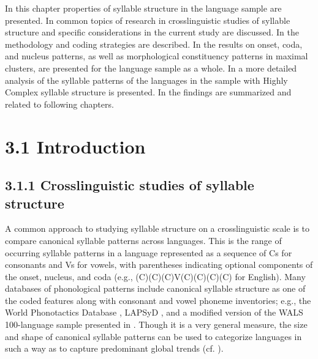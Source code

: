   In this chapter properties of syllable structure in the language sample are presented. In  common topics of research in crosslinguistic studies of syllable structure and specific considerations in the current study are discussed. In  the methodology and coding strategies are described. In  the results on onset, coda, and nucleus patterns, as well as morphological constituency patterns in maximal clusters, are presented for the language sample as a whole. In  a more detailed analysis of the syllable patterns of the languages in the sample with Highly Complex syllable structure is presented. In  the findings are summarized and related to following chapters.


\section{3.1 Introduction}
\subsection{3.1.1 Crosslinguistic studies of syllable structure}

  A common approach to studying syllable structure on a crosslinguistic scale is to compare canonical syllable patterns across languages. This is the range of occurring syllable patterns in a language represented as a sequence of Cs for consonants and Vs for vowels, with parentheses indicating optional components of the onset, nucleus, and coda (e.g., (C)(C)(C)V(C)(C)(C)(C) for English). Many databases of phonological patterns include canonical syllable structure as one of the coded features along with consonant and vowel phoneme inventories; e.g.,  the World Phonotactics Database \citep{DonohueEtAl2013}, LAPSyD \citep{MaddiesonEtAl2013}, and a modified version of the WALS 100-language sample presented in \citet{Gordon2016}. Though it is a very general measure, the size and shape of canonical syllable patterns can be used to categorize languages in such a way as to capture predominant global trends (cf. \citealt{Maddieson2013a}).



